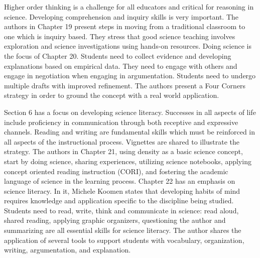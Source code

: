 \documentclass[11.5pt]{sig-alternate} %
\begin{document}
\begin{large}
Higher order thinking is a challenge for all educators and critical for reasoning in science. Developing comprehension and inquiry skills is very important. The authors in Chapter 19 present steps in moving from a traditional classroom to one which is inquiry based. They stress that good science teaching involves exploration and science investigations using hands-on resources.  Doing science is the focus of Chapter 20.  Students need to collect evidence and developing explanations based on empirical data. They need to engage with others and engage in negotiation when engaging in argumentation. Students need to undergo multiple drafts with improved refinement. The authors present a Four Corners strategy in order to ground the concept with a real world application.

Section 6 has a focus on developing science literacy.  Successes in all aspects of life include proficiency in communication through both receptive and expressive channels.  Reading and writing are fundamental skills which must be reinforced in all aspects of the instructional process. Vignettes are shared to illustrate the strategy. The authors in Chapter 21, using density as a basic science concept, start by doing science, sharing experiences, utilizing science notebooks, applying concept oriented reading instruction (CORI), and fostering the academic language of science in the learning process. Chapter 22 has an emphasis on science literacy. In it,  Michele Koomen states that developing habits of mind requires knowledge and application specific to the discipline being studied. Students need to read, write, think and communicate in science: read aloud, shared reading, applying graphic organizers, questioning the author and summarizing are all essential skills for science literacy.  The author shares the application of several tools to support students with vocabulary, organization, writing, argumentation, and explanation.


\end{large}
\end{document}
